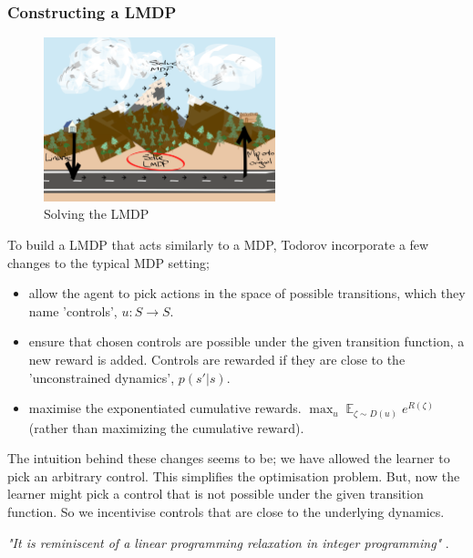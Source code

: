 \subsubsection{Constructing a LMDP}

\begin{figure}[h!]
  \centering
  \includegraphics[width=0.6\textwidth,height=0.3\textheight]{../../pictures/drawings/abstract-representations-solve.png}
  \caption{Solving the LMDP}
\end{figure}

To build a LMDP that acts similarly to a MDP, Todorov \cite{Todorov2006} incorporate a few changes to the typical MDP setting;

\begin{itemize}
\tightlist
  \item
  allow the agent to pick actions in the space of possible transitions, which they name 'controls', $u: S \to S$.
  \item
  ensure that chosen controls are possible under the given transition function, a new reward is added.
  Controls are rewarded if they are close to the 'unconstrained dynamics', $p(s' | s)$.
  \item
  maximise the exponentiated cumulative rewards.
  $\mathop{\text{max}}_{u} \mathop{\mathbb E}_{\zeta \sim D(u)} e^{R(\zeta)}$ \cite{EricWarrenFox2016} (rather than maximizing the cumulative reward).
\end{itemize}

The intuition behind these changes seems to be; we have allowed the learner to pick an arbitrary control.
This simplifies the optimisation problem. But, now the learner might pick a control that is not possible
under the given transition function. So we incentivise controls that are close to the underlying dynamics.

\begin{displayquote}
\textit{"It is reminiscent of a linear programming relaxation in integer programming"} \cite{Todorov2009}.
\end{displayquote}


